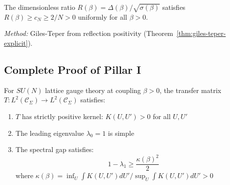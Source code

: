 \begin{tcolorbox}[colback=red!5!white,colframe=red!75!black,title=Pillar III: Uniform Dimensionless Bound]
The dimensionless ratio $R(\beta) = \Delta(\beta)/\sqrt{\sigma(\beta)}$ 
satisfies $R(\beta) \geq c_N \geq 2/N > 0$ uniformly for all $\beta > 0$.

\textit{Method:} Giles-Teper from reflection positivity 
(Theorem~\ref{thm:giles-teper-explicit}).
\end{tcolorbox}

\subsection{Complete Proof of Pillar I}

\begin{theorem}
\label{thm:quantitative-pf}
For $SU(N)$ lattice gauge theory at coupling $\beta > 0$, the transfer matrix 
$T : L^2(\mathcal{C}_\Sigma) \to L^2(\mathcal{C}_\Sigma)$ satisfies:
\begin{enumerate}[label=(\roman*)]
\item $T$ has strictly positive kernel: $K(U, U') > 0$ for all $U, U'$
\item The leading eigenvalue $\lambda_0 = 1$ is simple
\item The spectral gap satisfies:
\[
1 - \lambda_1 \geq \frac{\kappa(\beta)^2}{2}
\]
where $\kappa(\beta) = \inf_U \int K(U, U') dU' / \sup_U \int K(U, U') dU' > 0$
\end{enumerate}
\end{theorem}

